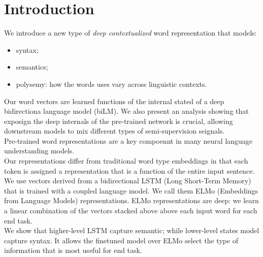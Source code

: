 \section{Introduction}

We introduce a new type of \textit{deep contextualized} word representation
that models:
\begin{itemize}
    \item syntax;
    \item semantics;
    \item polysemy: how the words uses vary across linguistic contexts.
\end{itemize}

Our word vectors are learned functions of the internal stated of a deep
bidirectiona language model (biLM).
We also present an analysis showing that exposign the deep internals of the
pre-trained network is crucial, allowing downstream models to mix different
types of semi-supervision seignals.\\

Pre-trained word representations are a key compoennt in many neural language
understanding models.\\
Our representations differ from traditional word type embeddings in that each
token is assigned a representation that is a function of the entire input
sentence. We use vectors derived from a bidirectional LSTM (Long Short-Term
Memory) that is trained with a coupled language model. 
We call them ELMo (Embeddings from Language Models) representations.
ELMo representations are deep: we learn a linear combination of the vectors
stacked above above each input word for each end task.\\
We show that higher-level LSTM capture semantic; while lower-level states
model capture syntax. It allows the finetuned model over ELMo select the type
of information that is most useful for end task.
